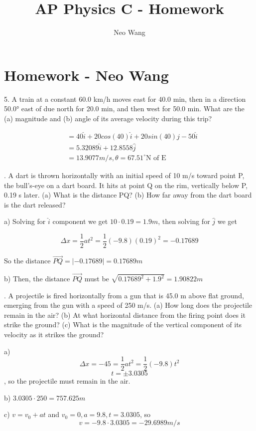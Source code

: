 \documentclass{scrreprt} %
\title{AP Physics C - Homework}
\author{Neo Wang}
\begin{document}
\section{Homework - Neo Wang}

5. A train at a constant 60.0 km/h moves east for 40.0 min,
then  in  a  direction  50.0° east  of  due  north  for  20.0 min, and  then
west for 50.0 min. What are the (a) magnitude and (b) angle of its
average velocity during this trip?

\begin{align*}
	&= 40\hat{i} + 20cos(40)\hat{i} + 20sin(40)\hat{j} - 50 \hat{i} \\
	&= 5.32089\hat{i} + 12.8558\hat{j} \\
	&= \boxed{13.9077 m/s, \theta = 67.51^\circ \textrm{N of E}}
\end{align*}

. A dart is thrown horizontally with an initial speed of 
10 m/s  toward  point  P, the  bull’s-eye  on  a  dart  board. It  hits  at
point Q on the rim, vertically below P, 0.19 s later. (a) What is the
distance PQ?  (b)  How  far  away  from  the  dart  board  is  the  dart
released? \newline

a) Solving for $\hat{i}$ component we get $10\cdot 0.19 = 1.9 m$, then solving
for $\hat{j}$ we get

$$\Delta x = \frac{1}{2}at^2 = \frac{1}{2}(-9.8)(0.19)^2=-0.17689$$

So the distance $\vec{PQ} = |-0.17689| = \boxed{0.17689 m}$

b) Then, the distance $\vec{PQ}$ must be $\sqrt{0.17689^2 + 1.9^2} = \boxed{1.90822 m}$\newline

. A projectile is fired horizontally from a gun that is 
45.0 m above flat ground, emerging from the gun with a speed of
250 m/s. (a) How long does the projectile remain in the air? (b) At
what  horizontal  distance  from  the  firing  point  does  it  strike  the
ground? (c) What is the magnitude of the vertical component of its
velocity as it strikes the ground? \newline

a) $$\Delta x = -45 = \frac{1}{2}at^2 = \frac{1}{2}(-9.8)t^2$$
$$t = \pm 3.0305$$, so the projectile must remain  in the air.

b) $3.0305\cdot 250 = \boxed{757.625 m}$

c) $v = v_0 + at$ and $v_0 = 0, a = 9.8, t = 3.0305$, so $$v = -9.8\cdot 3.0305 = \boxed{-29.6989 m/s}$$
\end{document}
